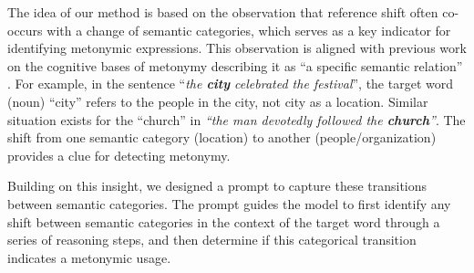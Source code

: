 \documentclass[11pt]{article}
\begin{document}
The idea of our method is based on the observation that reference shift often co-occurs with a change of semantic categories, which serves as a key indicator for identifying metonymic expressions. This observation is aligned with previous work on the cognitive bases of metonymy describing it as ``a specific semantic relation'' \citep{koch1999frame}.  
For example, in the sentence ``\textit{the \textbf{city} celebrated the festival}'', the target word (noun) ``city'' refers to the people in the city, not city as a location. Similar situation exists for the ``church'' in \textit{``the man devotedly followed the \textbf{church}''}. The shift from one semantic category (location) to another (people/organization) provides a clue for detecting metonymy.

Building on this insight, we designed a prompt to capture these transitions between semantic categories. The prompt guides the model to first identify any shift between semantic categories in the context of the target word through a series of reasoning steps, and then determine if this categorical transition indicates a metonymic usage. 
\end{document}
